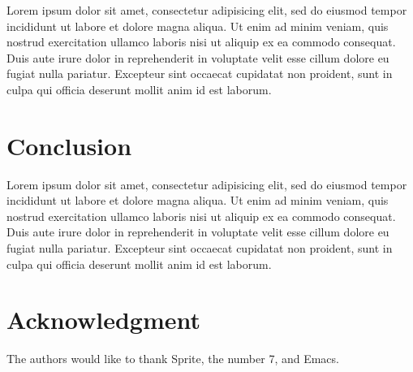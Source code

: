 \documentclass[conference]{IEEEtran}
\begin{document}

Lorem ipsum dolor sit amet, consectetur adipisicing elit, sed do eiusmod tempor incididunt
ut labore et dolore magna aliqua. Ut enim ad minim veniam, quis nostrud exercitation
ullamco laboris nisi ut aliquip ex ea commodo consequat. Duis aute irure dolor in
reprehenderit in voluptate velit esse cillum dolore eu fugiat nulla pariatur. Excepteur
sint occaecat cupidatat non proident, sunt in culpa qui officia deserunt mollit anim id
est laborum.










\section{Conclusion}
\label{sec:conclusion}


Lorem ipsum dolor sit amet, consectetur adipisicing elit, sed do eiusmod tempor incididunt
ut labore et dolore magna aliqua. Ut enim ad minim veniam, quis nostrud exercitation
ullamco laboris nisi ut aliquip ex ea commodo consequat. Duis aute irure dolor in
reprehenderit in voluptate velit esse cillum dolore eu fugiat nulla pariatur. Excepteur
sint occaecat cupidatat non proident, sunt in culpa qui officia deserunt mollit anim id
est laborum.



\section*{Acknowledgment}

The authors would like to thank Sprite, the number 7, and Emacs.





\end{document}
